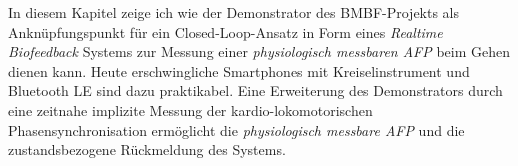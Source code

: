 \label{sec:zusammenfassung_6}

In diesem Kapitel zeige ich wie der Demonstrator des \acs{BMBF}-Projekts als Anknüpfungspunkt für ein Closed-Loop-Ansatz in Form eines \emph{Realtime Biofeedback} Systems zur Messung einer \emph{physiologisch messbaren \ac{AFP}} beim Gehen dienen kann. Heute erschwingliche Smartphones mit Kreiselinstrument und Bluetooth LE sind dazu praktikabel. Eine Erweiterung des Demonstrators durch eine zeitnahe implizite Messung der kardio-lokomotorischen Phasensynchronisation ermöglicht die \emph{physiologisch messbare \ac{AFP}} und die zustandsbezogene Rückmeldung des Systems.


